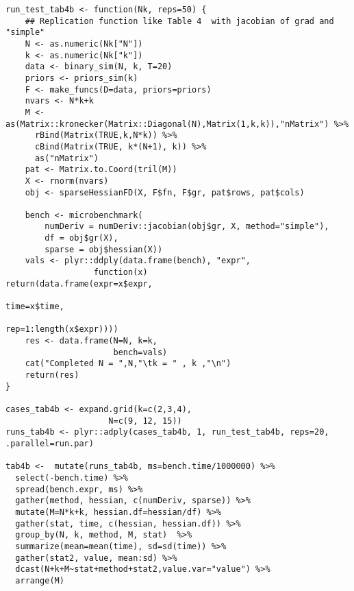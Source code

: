 \documentclass{article}
\newenvironment{revQuote}{\itshape}{\vspace{\baselineskip}}
\begin{document}
\begin{enumerate}
\begin{revQuote}
\begin{verbatim}
run_test_tab4b <- function(Nk, reps=50) {
    ## Replication function like Table 4  with jacobian of grad and
"simple"
    N <- as.numeric(Nk["N"])
    k <- as.numeric(Nk["k"])
    data <- binary_sim(N, k, T=20)
    priors <- priors_sim(k)
    F <- make_funcs(D=data, priors=priors)
    nvars <- N*k+k
    M <-
as(Matrix::kronecker(Matrix::Diagonal(N),Matrix(1,k,k)),"nMatrix") %>%
      rBind(Matrix(TRUE,k,N*k)) %>%
      cBind(Matrix(TRUE, k*(N+1), k)) %>%
      as("nMatrix")
    pat <- Matrix.to.Coord(tril(M))
    X <- rnorm(nvars)
    obj <- sparseHessianFD(X, F$fn, F$gr, pat$rows, pat$cols)

    bench <- microbenchmark(
        numDeriv = numDeriv::jacobian(obj$gr, X, method="simple"), 
        df = obj$gr(X),
        sparse = obj$hessian(X))
    vals <- plyr::ddply(data.frame(bench), "expr",
                  function(x)
return(data.frame(expr=x$expr,
                                               
time=x$time,
                                               
rep=1:length(x$expr))))
    res <- data.frame(N=N, k=k,
                      bench=vals)
    cat("Completed N = ",N,"\tk = " , k ,"\n")
    return(res)
}

cases_tab4b <- expand.grid(k=c(2,3,4),
                     N=c(9, 12, 15))
runs_tab4b <- plyr::adply(cases_tab4b, 1, run_test_tab4b, reps=20,
.parallel=run.par)

tab4b <-  mutate(runs_tab4b, ms=bench.time/1000000) %>%
  select(-bench.time) %>%
  spread(bench.expr, ms) %>%
  gather(method, hessian, c(numDeriv, sparse)) %>%
  mutate(M=N*k+k, hessian.df=hessian/df) %>%
  gather(stat, time, c(hessian, hessian.df)) %>%
  group_by(N, k, method, M, stat)  %>%
  summarize(mean=mean(time), sd=sd(time)) %>%
  gather(stat2, value, mean:sd) %>%
  dcast(N+k+M~stat+method+stat2,value.var="value") %>%
  arrange(M)


\end{verbatim}
\end{revQuote}
\end{enumerate}
\end{document}
